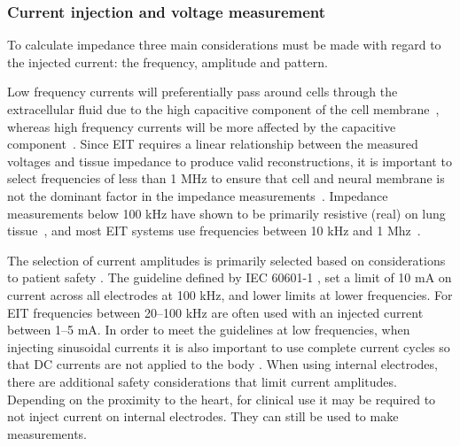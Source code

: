 \subsubsection{Current injection and voltage measurement}
To calculate impedance three main considerations must be made with regard to the 
injected current: the frequency, amplitude and pattern. 

Low frequency currents will 
preferentially pass around cells through the extracellular
fluid due to the high capacitive component of the cell 
membrane~\parencite{foster_whole-body_1996}, whereas high frequency currents will be 
more affected by the capacitive 
component~\parencite{holder_electrical_2004}. 
Since EIT requires a linear relationship between the measured voltages and 
tissue impedance to produce valid reconstructions,
it is important to select frequencies of less than 1 MHz to ensure that cell 
and neural membrane is not the dominant factor in the impedance 
measurements~\parencite{barber_applied_1984}.
Impedance measurements below 100 kHz have shown to be primarily resistive (real) on lung
tissue~\parencite{witsoe_electrical_1967}, and most EIT systems use
frequencies between 10 kHz and 1 Mhz~\parencite{holder_electrical_2004}.

The selection of current amplitudes is primarily selected based on 
considerations to patient safety \parencite{adler_electrical_2017}.
The guideline defined by IEC 60601-1 
\parencite{international_electrotechnical_commission_iec_2021}, set a limit 
of 10 mA on current across all electrodes at 100 kHz, and lower limits 
at lower frequencies. 
For EIT frequencies between 20--100 kHz are often used with 
an injected current
between 1--5 mA.
In order to meet the 
guidelines at low frequencies,
when injecting sinusoidal currents it is also important to use complete current cycles 
so that DC currents are not applied to the body \parencite{adler_electrical_2017}.
When using internal electrodes, there are additional safety considerations that limit
current amplitudes. Depending on the proximity to the heart, for clinical use 
it may be required to not inject current on internal electrodes. They can still be used
to make measurements. 

